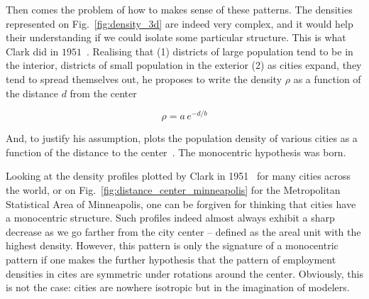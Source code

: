 Then comes the problem of how to makes sense of these patterns. The densities
represented on Fig.~\ref{fig:density_3d} are indeed very complex, and it would
help their understanding if we could isolate some particular structure.
This is what Clark did in $1951$~\cite{Clark:1951}. Realising that (1) districts of large
population tend to be in the interior, districts of small population in the
exterior (2) as cities expand, they tend to spread themselves out, he proposes
to write the density $\rho$ as a function of the distance $d$ from the center

\begin{equation}
    \rho = a\,e^{-d/b} 
\end{equation}

And, to justify his assumption, plots the population density of various cities as a function of
the distance to the center~\cite{Clark:1951}. The monocentric hypothesis was
born.

Looking at the density profiles plotted by Clark in 1951~\cite{Clark:1951} for
many cities across the world, or on Fig.~\ref{fig:distance_center_minneapolis}
for the Metropolitan Statistical Area of Minneapolis, one can be
forgiven for thinking that cities have a monocentric structure. Such profiles
indeed almost always exhibit a sharp decrease as we go farther from the city
center -- defined as the areal unit with the highest density. However, this
pattern is only the signature of a monocentric pattern if one makes the further
hypothesis that the pattern of employment densities in cites are symmetric
under rotations around the center. Obviously, this is not the case: cities are
nowhere isotropic but in the imagination of modelers.



